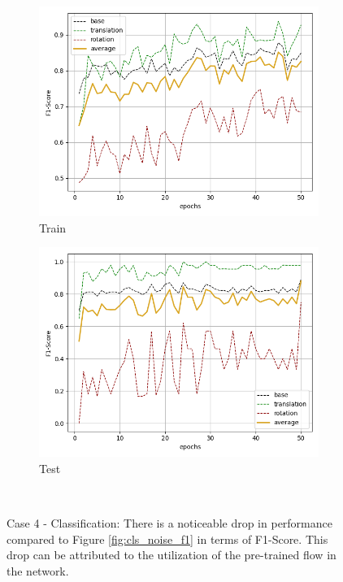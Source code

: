 \begin{figure}[H]
    \begin{subfigure}{.48\linewidth}
    \centering
    \includegraphics[scale=0.45]{Img/cls_flow_noise_train_f1.png}
    \caption{Train}
    \end{subfigure}
    \begin{subfigure}{.48\linewidth}
    \centering
    \includegraphics[scale=0.45]{Img/cls_flow_noise_test_f1.png}
    \caption{Test}
    \end{subfigure}\\
    \caption{Case 4 - Classification: There is a noticeable drop in performance compared to Figure \ref{fig:cls_noise_f1} in terms of F1-Score. This drop can be attributed to the utilization of the pre-trained flow in the network.}
    \label{fig:cls_flow_noise_f1}
\end{figure}
